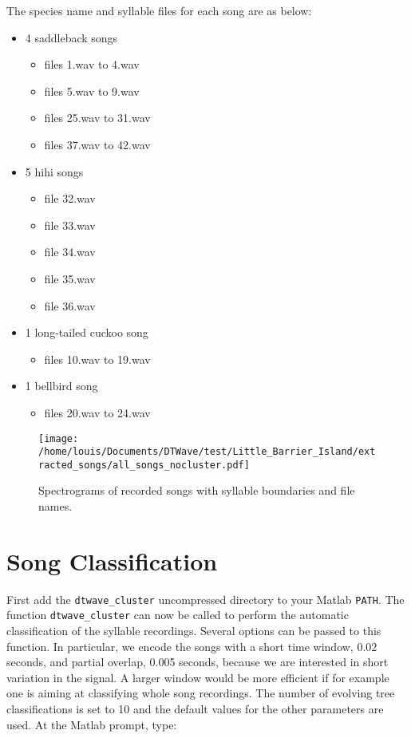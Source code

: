 \documentclass[a4paper]{article}
\begin{document}
The species name and syllable files for each song are as below:
\begin{itemize}
\item 4 saddleback songs
  \begin{itemize}
  \item files 1.wav to 4.wav
  \item files 5.wav to 9.wav
  \item files 25.wav to 31.wav
  \item files 37.wav to 42.wav
  \end{itemize}
\item 5 hihi songs
  \begin{itemize}
  \item file 32.wav
  \item file 33.wav
  \item file 34.wav
  \item file 35.wav
  \item file 36.wav
  \end{itemize}
\item 1 long-tailed cuckoo song
  \begin{itemize}
  \item files 10.wav to 19.wav
  \end{itemize}
\item 1 bellbird song
  \begin{itemize}
  \item files 20.wav to 24.wav
  \end{itemize}
\end{itemize}


\begin{figure}[h!]
\begin{center}
\texttt{[image: /home/louis/Documents/DTWave/test/Little\_Barrier\_Island/extracted\_songs/all\_songs\_nocluster.pdf]}
\vspace{1cm}
\caption{Spectrograms of recorded songs with syllable boundaries and file names.}
\end{center}
\label{fig:songs}
\end{figure}

\clearpage
\section{Song Classification}
First add the \texttt{dtwave\_cluster} uncompressed directory to your Matlab \texttt{PATH}.
The function \texttt{dtwave\_cluster} can now be called to perform the automatic classification of the syllable recordings.
Several options can be passed to this function.
In particular, we encode the songs with a short time window, 0.02 seconds, and partial overlap, 0.005 seconds, because we are interested in short variation in the signal.
A larger window would be more efficient if for example one is aiming at classifying whole song recordings.
The number of evolving tree classifications is set to 10 and the default values for the other parameters are used.
At the Matlab prompt, type:
\end{document}

